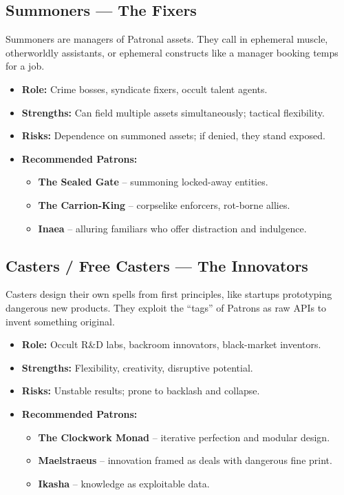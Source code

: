 \documentclass[11pt]{article}
\begin{document}
\subsection*{Summoners --- The Fixers}
Summoners are managers of Patronal assets. They call in ephemeral muscle, otherworldly assistants, or ephemeral constructs like a manager booking temps for a job.
\begin{itemize}
  \item \textbf{Role:} Crime bosses, syndicate fixers, occult talent agents.
  \item \textbf{Strengths:} Can field multiple assets simultaneously; tactical flexibility.
  \item \textbf{Risks:} Dependence on summoned assets; if denied, they stand exposed.
  \item \textbf{Recommended Patrons:}
    \begin{itemize}
      \item \textbf{The Sealed Gate} – summoning locked-away entities.
      \item \textbf{The Carrion-King} – corpselike enforcers, rot-borne allies.
      \item \textbf{Inaea} – alluring familiars who offer distraction and indulgence.
    \end{itemize}
\end{itemize}

\subsection*{Casters / Free Casters --- The Innovators}
Casters design their own spells from first principles, like startups prototyping dangerous new products. They exploit the “tags” of Patrons as raw APIs to invent something original.
\begin{itemize}
  \item \textbf{Role:} Occult R\&D labs, backroom innovators, black-market inventors.
  \item \textbf{Strengths:} Flexibility, creativity, disruptive potential.
  \item \textbf{Risks:} Unstable results; prone to backlash and collapse.
  \item \textbf{Recommended Patrons:}
    \begin{itemize}
      \item \textbf{The Clockwork Monad} – iterative perfection and modular design.
      \item \textbf{Maelstraeus} – innovation framed as deals with dangerous fine print.
      \item \textbf{Ikasha} – knowledge as exploitable data.
    \end{itemize}
\end{itemize}
\end{document}
